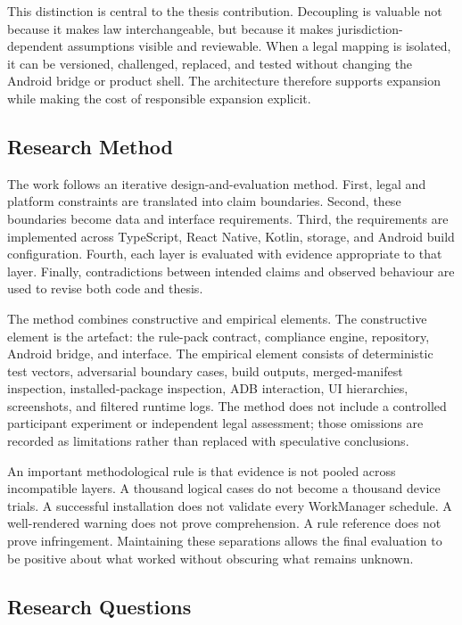 This distinction is central to the thesis contribution. Decoupling is valuable not because it makes law interchangeable, but because it makes jurisdiction-dependent assumptions visible and reviewable. When a legal mapping is isolated, it can be versioned, challenged, replaced, and tested without changing the Android bridge or product shell. The architecture therefore supports expansion while making the cost of responsible expansion explicit.

\subsection{Research Method}

The work follows an iterative design-and-evaluation method. First, legal and platform constraints are translated into claim boundaries. Second, these boundaries become data and interface requirements. Third, the requirements are implemented across TypeScript, React Native, Kotlin, storage, and Android build configuration. Fourth, each layer is evaluated with evidence appropriate to that layer. Finally, contradictions between intended claims and observed behaviour are used to revise both code and thesis.

The method combines constructive and empirical elements. The constructive element is the artefact: the rule-pack contract, compliance engine, repository, Android bridge, and interface. The empirical element consists of deterministic test vectors, adversarial boundary cases, build outputs, merged-manifest inspection, installed-package inspection, ADB interaction, UI hierarchies, screenshots, and filtered runtime logs. The method does not include a controlled participant experiment or independent legal assessment; those omissions are recorded as limitations rather than replaced with speculative conclusions.

An important methodological rule is that evidence is not pooled across incompatible layers. A thousand logical cases do not become a thousand device trials. A successful installation does not validate every WorkManager schedule. A well-rendered warning does not prove comprehension. A rule reference does not prove infringement. Maintaining these separations allows the final evaluation to be positive about what worked without obscuring what remains unknown.

\subsection{Research Questions}

